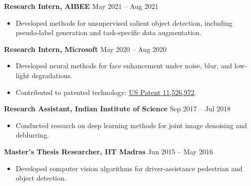 \documentclass[margin,11pt]{resume}
\begin{document}
\vspace{-.6em}
{\bf Research Intern, AIBEE} \hfill May 2021 -- Aug 2021\\
\vspace{-1.em}
\begin{itemize}[leftmargin=*,itemsep=0pt,topsep=0pt]
    \item Developed methods for unsupervised salient object detection, including pseudo-label generation and task-specific data augmentation.
\end{itemize}
\vspace{-.6em}
{\bf Research Intern, Microsoft} \hfill May 2020 -- Aug 2020\\
\vspace{-1.em}
\begin{itemize}[leftmargin=*,itemsep=0pt,topsep=0pt]
    \item Developed neural methods for face enhancement under noise, blur, and low-light degradations.
    \item Contributed to patented technology: \href{https://patents.google.com/patent/US11526972B2/en}{US Patent 11,526,972}.
\end{itemize}
\vspace{-.6em}
{\bf Research Assistant, Indian Institute of Science} \hfill Sep 2017 -- Jul 2018\\
\vspace{-1.em}
\begin{itemize}[leftmargin=*,itemsep=0pt,topsep=0pt]
    \item Conducted research on deep learning methods for joint image denoising and deblurring.
\end{itemize}
\vspace{-.6em}
{\bf Master's Thesis Researcher, IIT Madras} \hfill Jun 2015 -- May 2016\\
\vspace{-1.em}
\begin{itemize}[leftmargin=*,itemsep=0pt,topsep=0pt]
    \item Developed computer vision algorithms for driver-assistance pedestrian and object detection.
\end{itemize}

\vspace{-0.8em}
\end{document}
